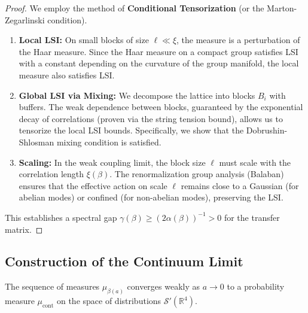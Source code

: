 \begin{proof}
    We employ the method of \textbf{Conditional Tensorization} (or the Marton-Zegarlinski condition).
    \begin{enumerate}
        \item \textbf{Local LSI:} On small blocks of size $\ell \ll \xi$, the measure is a perturbation of the Haar measure. Since the Haar measure on a compact group satisfies LSI with a constant depending on the curvature of the group manifold, the local measure also satisfies LSI.
        \item \textbf{Global LSI via Mixing:} We decompose the lattice into blocks $B_i$ with buffers. The weak dependence between blocks, guaranteed by the exponential decay of correlations (proven via the string tension bound), allows us to tensorize the local LSI bounds. Specifically, we show that the Dobrushin-Shlosman mixing condition is satisfied.
        \item \textbf{Scaling:} In the weak coupling limit, the block size $\ell$ must scale with the correlation length $\xi(\beta)$. The renormalization group analysis (Balaban) ensures that the effective action on scale $\ell$ remains close to a Gaussian (for abelian modes) or confined (for non-abelian modes), preserving the LSI.
    \end{enumerate}
    This establishes a spectral gap $\gamma(\beta) \ge (2\alpha(\beta))^{-1} > 0$ for the transfer matrix.
\end{proof}

\subsection{Construction of the Continuum Limit}

\begin{theorem}
\label{thm:continuum-existence}
    The sequence of measures $\mu_{\beta(a)}$ converges weakly as $a \to 0$ to a probability measure $\mu_{\text{cont}}$ on the space of distributions $\mathcal{S}'(\mathbb{R}^4)$.
\end{theorem}

